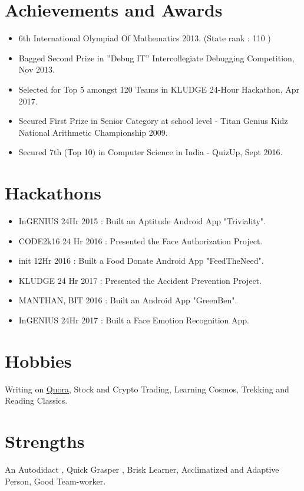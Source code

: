\documentclass[margin, centered]{res}
\begin{document}
\begin{resume}
\section{Achievements and Awards}
\begin{itemize}[leftmargin=*]
 \item 6th International Olympiad Of Mathematics 2013. (State rank : 110 )
 \item Bagged Second Prize in ''Debug IT'' Intercollegiate Debugging Competition, Nov 2013.
 \item Selected for Top 5 amongst 120 Teams in KLUDGE 24-Hour Hackathon, Apr 2017.
 \item Secured First Prize in Senior Category at school level - Titan Genius Kidz National
Arithmetic Championship 2009.
 \item Secured 7th (Top 10) in Computer Science in India - QuizUp, Sept 2016.
\end{itemize}

\section{Hackathons}
\begin{itemize}[leftmargin=*]
 \item InGENIUS 24Hr 2015 : Built an Aptitude Android App "Triviality". 
 \item CODE2k16 24 Hr 2016 : Presented the Face Authorization Project.
 \item init 12Hr 2016 : Built a Food Donate Android App "FeedTheNeed".
 \item KLUDGE 24 Hr 2017 : Presented the Accident Prevention Project. 
 \item MANTHAN, BIT 2016 : Built an Android App "GreenBen". 
 \item InGENIUS 24Hr 2017 : Built a Face Emotion Recognition App.
\end{itemize}


\section{Hobbies}
Writing on \href{https://www.quora.com/profile/Sharath-Guna-1}{Quora}, Stock and Crypto Trading, Learning Cosmos, Trekking and Reading Classics.

\section{Strengths}
An Autodidact , Quick Grasper , Brisk Learner, Acclimatized and Adaptive Person, Good Team-worker.

\end{resume}
\end{document}
